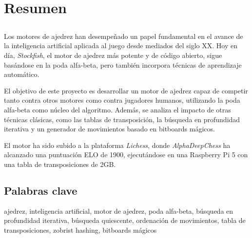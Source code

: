 \chapter*{Resumen}

\section*{\tituloPortadaVal}

Los motores de ajedrez han desempeñado un papel fundamental en el avance de la inteligencia artificial aplicada al juego desde mediados del siglo XX. Hoy en día, \textit{Stockfish}, el motor de ajedrez más potente y de código abierto, sigue basándose en la poda alfa-beta, pero también incorpora técnicas de aprendizaje automático.

\vspace{1em}

El objetivo de este proyecto es desarrollar un motor de ajedrez capaz de competir tanto contra otros motores como contra jugadores humanos, utilizando la poda alfa-beta como núcleo del algoritmo. Además, se analiza el impacto de otras técnicas clásicas, como las tablas de transposición, la búsqueda en profundidad iterativa y un generador de movimientos basado en bitboards mágicos.

\vspace{1em}

El motor ha sido subido a la plataforma \textit{Lichess}, donde \textit{AlphaDeepChess} ha alcanzado una puntuación ELO de 1900, ejecutándose en una Raspberry Pi 5 con una tabla de transposiciones de 2GB.

\section*{Palabras clave}
   
\noindent ajedrez, inteligencia artificial, motor de ajedrez, poda alfa-beta, búsqueda en profundidad iterativa, búsqueda quiescente, ordenación de movimientos, tabla de transposiciones, zobrist hashing, bitboards mágicos

